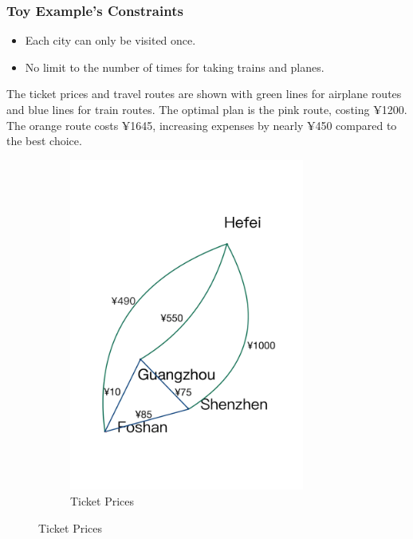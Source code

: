 \documentclass{article}
\begin{document}
\subsubsection{Toy Example's Constraints}
\begin{itemize}
  \item Each city can only be visited once.
  \item No limit to the number of times for taking trains and planes.
\end{itemize}

The ticket prices and travel routes are shown with green lines for airplane
routes and blue lines for train routes. The optimal plan is the pink route,
costing ¥1200. The orange route costs ¥1645, increasing expenses by nearly ¥450
compared to the best choice.
\begin{figure}[!ht]
  \centering
  \begin{subfigure}{0.3\textwidth}
    \includegraphics[width=0.85\textwidth]{pic/1.png}
    \caption{Ticket Prices}%
    \label{fig:your_image1}
  \end{subfigure}
  \hfill %

\end{figure}
\end{document}

